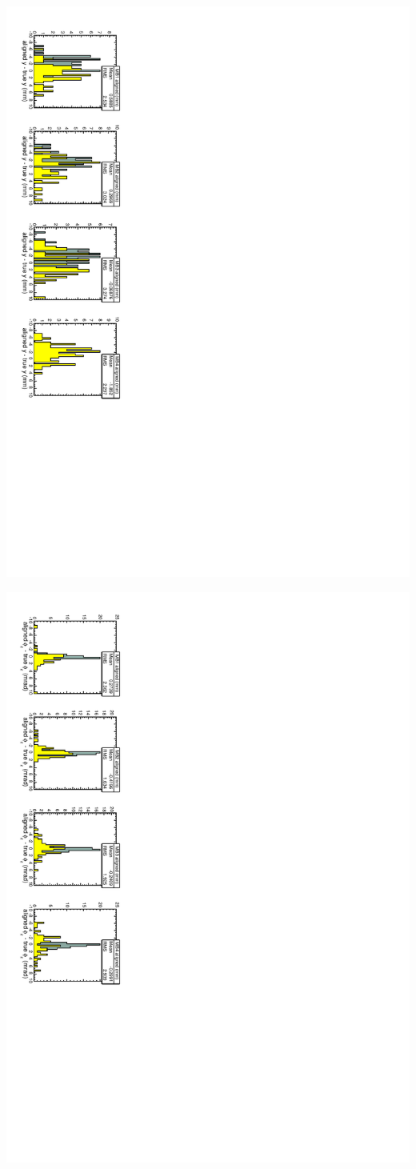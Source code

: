 \documentclass[compress]{beamer}
\begin{document}
\begin{frame}
\includegraphics[height=\linewidth, angle=90]{S43_plots/RestrictPT10_MuonPT5_barrely.pdf}

\includegraphics[height=\linewidth, angle=90]{S43_plots/RestrictPT10_MuonPT5_barrelphiz.pdf}

\end{frame}
\end{document}
